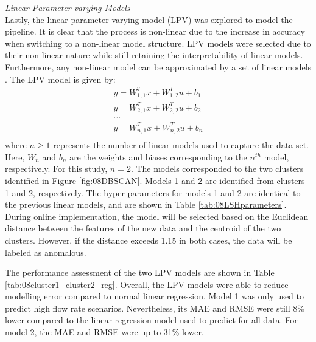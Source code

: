%
%
\noindent
\textit{Linear Parameter-varying Models} \\
Lastly, the linear parameter-varying model (LPV) was explored to model the pipeline. It is clear that the process is non-linear due to the increase in accuracy when switching to a non-linear model structure. LPV models were selected due to their non-linear nature while still retaining the interpretability of linear models. Furthermore, any non-linear model can be approximated by a set of linear models \cite{LPV}. The LPV model is given by:
\begin{equation}
    \begin{split}
        \hat{y} = W_{1, 1}^Tx + W_{1, 2}^Tu + b_1 \\
        \hat{y} = W_{2, 1}^Tx + W_{2, 2}^Tu+ b_2 \\
        ... \\
        \hat{y} = W_{n, 1}^Tx + W_{n, 2}^Tu + b_n \\
    \end{split}
    \label{eq:08LPV_structure}
\end{equation}
where $n \geq 1$ represents the number of linear models used to capture the data set. Here, $W_n$ and $b_n$ are the weights and biases corresponding to the $n^{th}$ model, respectively. For this study, $n=2$.  The models corresponded to the two clusters identified in Figure \ref{fig:08DBSCAN}.  Models 1 and 2 are identified from clusters 1 and 2, respectively.  The hyper parameters for models 1 and 2 are identical to the previous linear models, and are shown in Table \ref{tab:08LSHparameters}. During online implementation, the model will be selected based on the Euclidean distance between the features of the new data and the centroid of the two clusters.  However, if the distance exceeds 1.15 in both cases, the data will be labeled as anomalous.

The performance assessment of the two LPV models are shown in Table \ref{tab:08cluster1_cluster2_reg}. Overall, the LPV models were able to reduce modelling error compared to normal linear regression. Model 1 was only used to predict high flow rate scenarios. Nevertheless, its MAE and RMSE were still 8\% lower compared to the linear regression model used to predict for all data.  For model 2, the MAE and RMSE were up to 31\% lower. 

